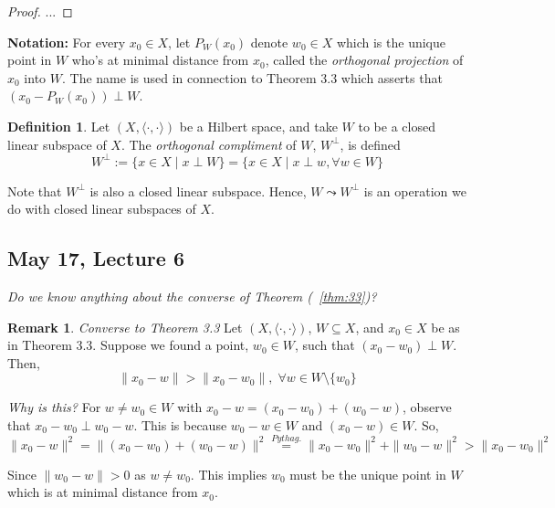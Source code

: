 \documentclass[11pt]{amsart}
\theoremstyle{definition}
\newtheorem{definition}[theorem]{Definition}
\newtheorem{remark}[theorem]{Remark}
\numberwithin{equation}{section}
\newcommand{\ips}{ \left( X, \langle \cdot, \cdot \rangle \right) }		%
\newcommand{\proj}{ P_W(x_0) } 							%
\begin{document}
\begin{proof}
...
\end{proof}

\vspace{6pt}

\textbf{Notation:}  For every $x_0 \in X$, let $\proj$ denote $w_0 \in X$ which is the unique point in $W$ who's at minimal distance from $x_0$, called the \textit{orthogonal projection} of $x_0$ into $W$. The name is used in connection to Theorem 3.3 which asserts that $(x_0 - \proj) \perp W$. 

\vspace{10pt}

\begin{definition}\label{def:34}
Let $\ips$ be a Hilbert space, and take $W$ to be a closed linear subspace of $X$. The \textit{orthogonal compliment} of $W$, $W^\perp$, is defined 
\[ W^\perp := \{ x \in X \; | \; x \perp W \} = \{ x \in X \; | \; x \perp w, \forall w \in W \} \]
\end{definition}

\noindent Note that $W^\perp$ is also a closed linear subspace. Hence, $W \leadsto W^\perp$ is an operation we do with closed linear subspaces of $X$. 

\vspace{10pt}

\subsection{May 17, Lecture 6} \textit{Do we know anything about the converse of Theorem (~\ref{thm:33})?}

\begin{remark}\label{rem:35}\textit{Converse to Theorem 3.3}
Let $\ips$, $W \subseteq X$, and $x_0 \in X$ be as in Theorem 3.3. Suppose we found a point, $w_0 \in W$, such that $(x_0 - w_0) \perp W$. Then, 
\[ \label{eq:OP-Metric} \tag{OP Metric} \|x_0 - w\| > \|x_0 - w_0\|, \; \forall w \in W \setminus \{w_0\} \]
\end{remark} 

\textit{Why is this?} For $w \not = w_0 \in W$ with $x_0 - w = (x_0 - w_0) + (w_0 - w)$, observe that $x_0 - w_0 \perp w_0 - w$. This is because $w_0 - w \in W$ and $(x_0 - w) \in W$. So, 
\[\|x_0 - w\|^2 = \| (x_0 - w_0) + (w_0 - w)\|^2 \overset{Pythag.} = \|x_0 - w_0\|^2 + \|w_0 - w\|^2 > \|x_0 - w_0\|^2\]

\vspace{6pt}
\noindent Since $\|w_0 - w\|> 0 $ as $w \not = w_0$. 
This implies $w_0$ must be the unique point in $W$ which is at minimal distance from $x_0$. 
\end{document}
